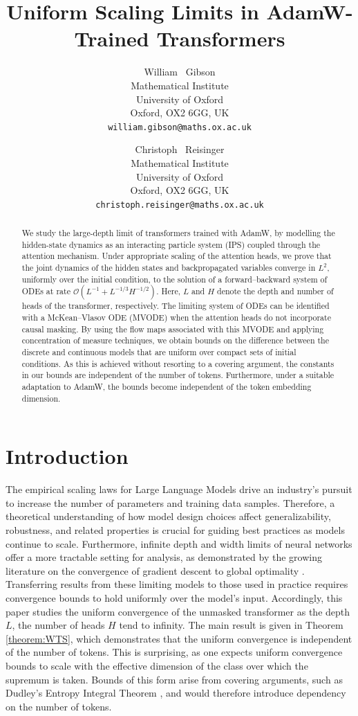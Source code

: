\documentclass{article}
\title{Uniform Scaling Limits in AdamW-Trained Transformers}
\author{
  William ~Gibson\\
  Mathematical Institute\\
  University of Oxford\\
  Oxford, OX2 6GG, UK\\
  \texttt{william.gibson@maths.ox.ac.uk}
   \and
  Christoph ~Reisinger \\ Mathematical Institute \\
  University of Oxford \\ Oxford, OX2 6GG, UK\\
  \texttt{christoph.reisinger@maths.ox.ac.uk}
}
\begin{document}
\maketitle

\begin{abstract}
  We study the large-depth limit of transformers trained with AdamW, by modelling the hidden-state dynamics as an interacting particle system (IPS) coupled through the attention mechanism.
  Under appropriate scaling of the attention heads, we prove that the joint dynamics of the hidden states and backpropagated variables converge in $L^2$, uniformly over the initial condition, to the solution of a forward--backward system of ODEs at rate $\mathcal O(L^{-1}+L^{-1/3}H^{-1/2})$. Here, $L$ and $H$ denote the depth and number of heads of the transformer, respectively. The limiting system of ODEs can be identified with a McKean--Vlasov ODE (MVODE) when the attention heads do not incorporate causal masking. By using the flow maps associated with this MVODE and applying concentration of measure techniques, we obtain bounds on the difference between the discrete and continuous models that are uniform over compact sets of initial conditions. As this is achieved without resorting to a covering argument, the constants in our bounds are independent of the number of tokens. Furthermore, under a suitable adaptation to AdamW, the bounds become independent of the token embedding dimension.
\end{abstract}
\section{Introduction}\label{sec:Intro}
The empirical scaling laws for Large Language Models \cite{kaplan2020scalinglawsneurallanguage} drive an industry's pursuit to increase the number of parameters and training data samples. Therefore, a theoretical understanding of how model design choices affect generalizability, robustness, and related properties is crucial for guiding best practices as models continue to scale. Furthermore, infinite depth and width limits of neural networks offer a more tractable setting for analysis, as demonstrated by the growing literature on the convergence of gradient descent to global optimality \cite{barboni2025understandingtraininginfinitelydeep,chizat2018globalconvergencegradientdescent,isobe2024convergenceresultcontinuousmodel}. Transferring results from these limiting models to those used in practice requires convergence bounds to hold uniformly over the model's input. Accordingly, this paper studies the uniform convergence of the unmasked transformer \cite{NIPS2017_3f5ee243} as the depth $L$, the number of heads $H$ tend to infinity. The main result is given in Theorem \ref{theorem:WTS}, which demonstrates that the uniform convergence is independent of the number of tokens. This is surprising, as one expects uniform convergence bounds to scale with the effective dimension of the class over which the supremum is taken. Bounds of this form arise from covering arguments, such as Dudley's Entropy Integral Theorem \cite{Wainwright_2019}, and would therefore introduce dependency on the number of tokens.
\end{document}
